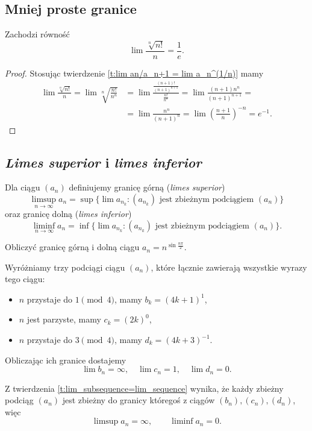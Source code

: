 \subsection{Mniej proste granice}
\begin{theorem}
    Zachodzi równość
    \[ \lim\frac{\sqrt[n]{n!}}{n} = \frac{1}{e}. \]
\end{theorem}
\begin{proof}
    Stosując twierdzenie \ref{t:lim an/a_n+1 = lim a_n^(1/n)} mamy
    \[\begin{aligned} \lim\frac{\sqrt[n]{n!}}{n} = \lim\sqrt[n]{\frac{n!}{n^n}} &= \lim\frac{\frac{(n+1)!}{(n+1)^{n+1}}}{\frac{n!}{n^n}} = \lim\frac{(n+1)n^n}{(n+1)^{n+1}} = \\
        &= \lim\frac{n^n}{(n+1)^n} = \lim\left(\frac{n+1}{n}\right)^{-n} = e^{-1}. \end{aligned}\]
\end{proof}

\subsection{\textit{Limes superior} i \textit{limes inferior}}
\begin{definition}
    Dla ciągu $(a_n)$ definiujemy granicę górną (\textit{limes superior})
    \[ \limsup_{n \to \infty} a_n = \sup\{\lim a_{n_k} : (a_{n_k}) \text{ jest zbieżnym podciągiem } (a_n)\} \]
    oraz granicę dolną (\textit{limes inferior})
    \[ \liminf_{n \to \infty} a_n = \inf\{\lim a_{n_k} : (a_{n_k}) \text{ jest zbieżnym podciągiem } (a_n)\}. \]
\end{definition}

\begin{example}
    Obliczyć granicę górną i dolną ciągu $a_n = n^{\sin\frac{n\pi}{2}}$.
\end{example}
\begin{solution}
    Wyróżniamy trzy podciągi ciągu $(a_n)$, które łącznie zawierają wszystkie wyrazy tego ciągu:
    \begin{itemize}
        \item $n$ przystaje do $1 \pmod{4}$, mamy $b_k = (4k + 1)^1$,
        \item $n$ jest parzyste, mamy $c_k = (2k)^0$,
        \item $n$ przystaje do $3 \pmod{4}$, mamy $d_k = (4k + 3)^{-1}$.
    \end{itemize}

    Obliczając ich granice dostajemy
    \[ \lim b_n = \infty, \quad \lim c_n = 1, \quad \lim d_n = 0. \]

    Z twierdzenia \ref{t:lim_subsequence=lim_sequence} wynika, że każdy zbieżny podciąg $(a_n)$ jest zbieżny do granicy któregoś z ciągów $(b_n), (c_n), (d_n)$, więc
    \[ \limsup a_n = \infty, \qquad \liminf a_n = 0. \]
\end{solution}